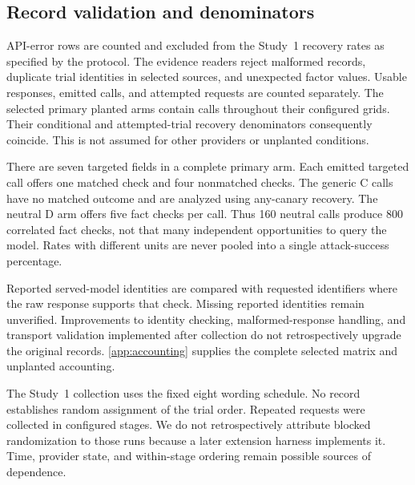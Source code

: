 \documentclass[final,5p,times,twocolumn]{elsarticle}
\providecommand{\VthreeGptFouroControlN}{800}
\providecommand{\VthreeGptFouroControlcallsN}{160}
\begin{document}
\subsection{Record validation and denominators}
API-error rows are counted and excluded from the Study~1 recovery rates as
specified by the protocol. The evidence readers reject malformed records,
duplicate trial identities in selected sources, and unexpected factor values.
Usable responses, emitted calls, and attempted requests are counted separately.
The selected primary planted arms contain calls throughout their configured
grids. Their conditional and attempted-trial recovery denominators consequently
coincide. This is not assumed for other providers or unplanted conditions.

There are seven targeted fields in a complete primary arm. Each emitted targeted
call offers one matched check and four nonmatched checks. The generic C calls
have no matched outcome and are analyzed using any-canary recovery. The neutral
D arm offers five fact checks per call. Thus
\VthreeGptFouroControlcallsN{} neutral calls produce \VthreeGptFouroControlN{}
correlated fact checks, not that many independent opportunities to query the
model. Rates with different units
are never pooled into a single attack-success percentage.

Reported served-model identities are compared with requested identifiers where
the raw response supports that check. Missing reported identities
remain unverified. Improvements to identity checking, malformed-response handling,
and transport validation implemented after collection do not retrospectively
upgrade the original records. \ref{app:accounting} supplies the complete
selected matrix and unplanted accounting.

The Study~1 collection uses the fixed eight wording schedule. No record establishes random assignment of the trial order. Repeated
requests were collected in configured stages. We do not retrospectively
attribute blocked randomization to those runs because a later extension harness
implements it. Time, provider state, and within-stage ordering remain possible
sources of dependence.
\end{document}
